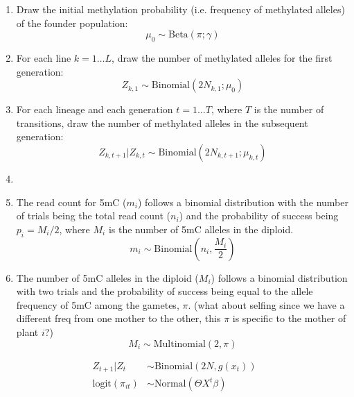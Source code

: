 \documentclass[preview]{standalone}
\begin{document}
\begin{enumerate}
\item Draw the initial methylation probability (i.e. frequency of
  methylated alleles) of the founder population:
  \begin{displaymath}
    \mu_0 \sim \mathrm{Beta}(\pi; \gamma)
  \end{displaymath}
\item For each line \( k=1 \ldots L \), draw the number of methylated
  alleles for the first generation:
  \begin{displaymath}
     Z_{k,1} \sim \mathrm{Binomial}(2N_{k,1}; \mu_{0})
  \end{displaymath}
\item For each lineage and each generation \(t=1 \ldots T\), where
  \(T\) is the number of transitions, draw the number of methylated
  alleles in the subsequent generation:
  \begin{displaymath}
    Z_{k,t+1} | Z_{k,t} \sim \mathrm{Binomial}(2N_{k,t+1}; \mu_{k,t})
  \end{displaymath}
\item
\item The read count for 5mC (\(m_i\)) follows a binomial distribution
  with the number of trials being the total read count (\(n_i\)) and
  the probability of success being \(p_i = M_i / 2\), where \(M_i\) is
  the number of 5mC alleles in the diploid.
  \begin{displaymath}
    m_i \sim \mathrm{Binomial}(n_i, \frac{M_i}{2})
  \end{displaymath}
\item The number of 5mC alleles in the diploid (\(M_i\)) follows a
  binomial distribution with two trials and the probability of success
  being equal to the allele frequency of 5mC among the gametes,
  \(\pi\). (what about selfing since we have a different freq from one
  mother to the other, this \(\pi\) is specific to the mother of plant
  \(i\)?)
  \begin{displaymath}
     M_i \sim \mathrm{Multinomial}(2, \pi)
  \end{displaymath}
\end{enumerate}
\begin{align}
  Z_{t+1}|Z_t &\sim \mathrm{Binomial}(2N, g(x_t))
  \\ \mathrm{logit}(\pi_{it}) &\sim \mathrm{Normal}(\Theta X^t\beta)
\end{align}
\end{document}
